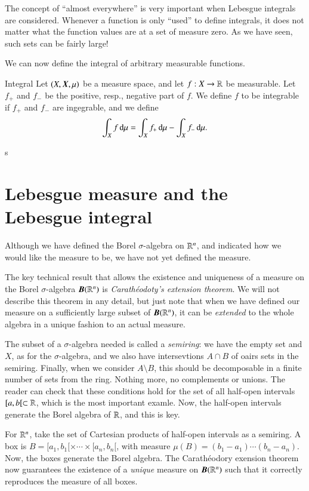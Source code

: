The concept of ``almost everywhere'' is very important when Lebesgue integrals are considered. Whenever a function is only ``used'' to define integrals, it does not matter what the function values are at a set of measure zero. As we have seen, such sets can be fairly large!

We can now define the integral of arbitrary measurable functions.
\begin{myDefinition}{Integral}{}
    Let $(X,\boldsymbol{X},\mu)$ be a measure space, and let $f : X \to \mathbb{R}$ be measurable. Let $f_+$ and $f_-$ be the positive, resp., negative part of $f$. We define $f$ to be integrable if $f_+$ and $f_-$ are ingegrable, and we define
    \begin{equation}
        \int_X f \, \mathrm{d} \mu = \int_X f_+ \, \mathrm{d}\mu - \int_X f_-\,\mathrm{d} \mu.
    \end{equation}
\end{myDefinition}

s
\section{Lebesgue measure and the Lebesgue integral}

Although we have defined the Borel $\sigma$-algebra on $\mathbb{R}^n$, and indicated how we would like the measure to be, we have not yet defined the measure.

The key technical result that allows the existence and uniqueness of a measure on the Borel $\sigma$-algebra $\boldsymbol{B}(\mathbb{R}^n)$ is \emph{Carathéodoty's extension theorem}. We will not describe this theorem in any detail, but just note that when we have defined our measure on a sufficiently large subset of $\boldsymbol{B}(\mathbb{R}^n)$, it can be \emph{extended} to the whole algebra in a unique fashion to an actual measure.

The subset of a $\sigma$-algebra needed is called a \emph{semiring}: we have the empty set and $X$, as for the $\sigma$-algebra, and we also have intersevtions $A\cap B$ of oairs sets in the semiring. Finally, when we consider $A \setminus B$, this should be decomposable in a finite number of sets from the ring. Nothing more, no complements or unions. The reader can check that these conditions hold for the set of all half-open intervals $[a,b[\subset\mathbb{R}$, which is the most important examle. Now, the half-open intervals generate the Borel algebra of $\mathbb{R}$, and this is key.

For $\mathbb{R}^n$, take the set of Cartesian products of half-open intervals as a semiring. A box is $B = [a_1,b_1[\times\cdots\times[a_n,b_n[$, with measure $\mu(B)=(b_1-a_1)\cdots(b_n-a_n)$. Now, the boxes generate the Borel algebra. The Carathéodory exension theorem now guarantees the existence of a \emph{unique} measure on $\boldsymbol{B}(\mathbb{R}^n)$ such that it correctly reproduces the measure of all boxes.

